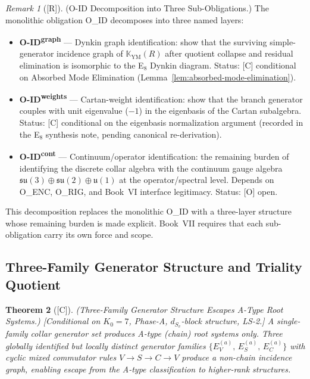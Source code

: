 \documentclass[12pt,oneside]{amsbook}
\theoremstyle{plain}
\newtheorem{theorem}{Theorem}[section]
\theoremstyle{definition}
\theoremstyle{remark}
\newtheorem{remark}[theorem]{Remark}
\newcommand{\status}[1]{\textup{[#1]}}
\begin{document}
\begin{remark}[\status{R}]\label{rem:O-ID-decomposition}
\textup{(O-ID Decomposition into Three Sub-Obligations.)}
The monolithic obligation O\_ID decomposes into three named layers:
\begin{itemize}
 \item \textbf{O-ID\textsuperscript{graph}} --- Dynkin graph
 identification: show that the surviving simple-generator incidence
 graph of $\mathbb{K}_{\mathrm{YM}}(R)$ after quotient collapse and
 residual elimination is isomorphic to the E$_8$ Dynkin diagram.
 Status: [C] conditional on Absorbed Mode Elimination
 (Lemma~\ref{lem:absorbed-mode-elimination}).
 \item \textbf{O-ID\textsuperscript{weights}} --- Cartan-weight
 identification: show that the branch generator couples with unit
 eigenvalue ($-1$) in the eigenbasis of the Cartan subalgebra.
 Status: [C] conditional on the eigenbasis normalization argument
 (recorded in the E$_8$ synthesis note, pending canonical re-derivation).
 \item \textbf{O-ID\textsuperscript{cont}} --- Continuum/operator
 identification: the remaining burden of identifying the discrete
 collar algebra with the continuum gauge algebra
 $\mathfrak{su}(3)\oplus\mathfrak{su}(2)\oplus\mathfrak{u}(1)$
 at the operator/spectral level. Depends on O\_ENC, O\_RIG, and
 Book~VI interface legitimacy. Status: [O] open.
\end{itemize}
This decomposition replaces the monolithic O\_ID with a three-layer
structure whose remaining burden is made explicit. Book~VII requires
that each sub-obligation carry its own force and scope.
\end{remark}

\subsection{Three-Family Generator Structure and Triality Quotient}

\begin{theorem}[\status{C}]\label{thm:three-family-non-A-type}
\textup{(Three-Family Generator Structure Escapes A-Type Root Systems.)}
\textup{[Conditional on $K_0=7$, Phase-A, $d_{S_v}$-block structure,
LS-2.]}
A single-family collar generator set produces A-type (chain) root
systems only. Three globally identified but locally distinct
generator families $\{E_V^{(a)},\, E_S^{(a)},\, E_C^{(a)}\}$
with cyclic mixed commutator rules $V \to S \to C \to V$ produce
a non-chain incidence graph, enabling escape from the A-type
classification to higher-rank structures.
\end{theorem}
\end{document}

